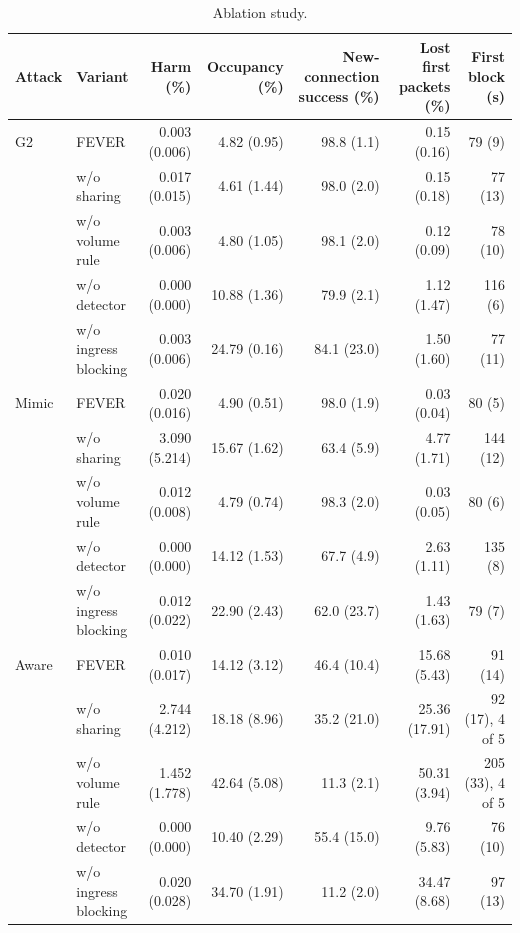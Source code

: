 \begin{table}[t]
\centering
\caption{Ablation study.}
\label{tab:ablation}
\footnotesize
\begin{tabular}{llrrrrr}
\toprule
Attack & Variant & Harm (\%) & Occupancy (\%) & New-connection success (\%) & Lost first packets (\%) & First block (s) \\
\midrule
G2 & FEVER & 0.003 (0.006) & 4.82 (0.95) & 98.8 (1.1) & 0.15 (0.16) & 79 (9) \\
 & w/o sharing & 0.017 (0.015) & 4.61 (1.44) & 98.0 (2.0) & 0.15 (0.18) & 77 (13) \\
 & w/o volume rule & 0.003 (0.006) & 4.80 (1.05) & 98.1 (2.0) & 0.12 (0.09) & 78 (10) \\
 & w/o detector & 0.000 (0.000) & 10.88 (1.36) & 79.9 (2.1) & 1.12 (1.47) & 116 (6) \\
 & w/o ingress blocking & 0.003 (0.006) & 24.79 (0.16) & 84.1 (23.0) & 1.50 (1.60) & 77 (11) \\
\midrule
Mimic & FEVER & 0.020 (0.016) & 4.90 (0.51) & 98.0 (1.9) & 0.03 (0.04) & 80 (5) \\
 & w/o sharing & 3.090 (5.214) & 15.67 (1.62) & 63.4 (5.9) & 4.77 (1.71) & 144 (12) \\
 & w/o volume rule & 0.012 (0.008) & 4.79 (0.74) & 98.3 (2.0) & 0.03 (0.05) & 80 (6) \\
 & w/o detector & 0.000 (0.000) & 14.12 (1.53) & 67.7 (4.9) & 2.63 (1.11) & 135 (8) \\
 & w/o ingress blocking & 0.012 (0.022) & 22.90 (2.43) & 62.0 (23.7) & 1.43 (1.63) & 79 (7) \\
\midrule
Aware & FEVER & 0.010 (0.017) & 14.12 (3.12) & 46.4 (10.4) & 15.68 (5.43) & 91 (14) \\
 & w/o sharing & 2.744 (4.212) & 18.18 (8.96) & 35.2 (21.0) & 25.36 (17.91) & 92 (17), 4 of 5 \\
 & w/o volume rule & 1.452 (1.778) & 42.64 (5.08) & 11.3 (2.1) & 50.31 (3.94) & 205 (33), 4 of 5 \\
 & w/o detector & 0.000 (0.000) & 10.40 (2.29) & 55.4 (15.0) & 9.76 (5.83) & 76 (10) \\
 & w/o ingress blocking & 0.020 (0.028) & 34.70 (1.91) & 11.2 (2.0) & 34.47 (8.68) & 97 (13) \\
\bottomrule
\end{tabular}
\end{table}

